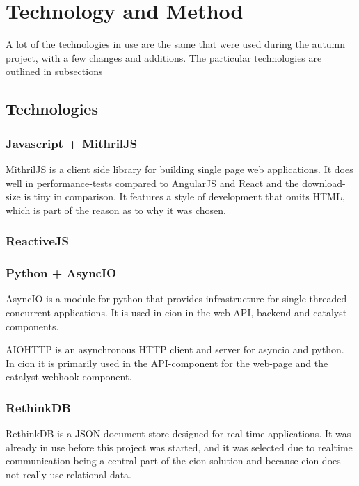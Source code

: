 \chapter{Technology and Method}
\label{chap:process}

A lot of the technologies in use are the same that were used during the autumn project, with a few changes and additions. The particular technologies are outlined in subsections
\section{Technologies}

\subsection{Javascript + MithrilJS}
MithrilJS is a client side library for building single page web applications\cite{mithriljs}. It does well in performance-tests compared to AngularJS and React and the download-size is tiny in comparison\cite{mithril-framework-comparison}. It features a style of development that omits HTML, which is part of the reason as to why it was chosen.

\subsection{ReactiveJS}

\subsection{Python + AsyncIO}
AsyncIO is a module for python that provides infrastructure for single-threaded concurrent applications\cite{python-asyncio}. It is used in cion in the web API, backend and catalyst components. 

AIOHTTP is an asynchronous HTTP client and server for asyncio and python. In cion it is primarily used in the API-component for the web-page and the catalyst webhook component\cite{python-aiohttp}.

\subsection{RethinkDB}
RethinkDB is a JSON document store designed for real-time applications\cite{rethinkdb}. It was already in use before this project was started, and it was selected due to realtime communication being a central part of the cion solution and because cion does not really use relational data.

